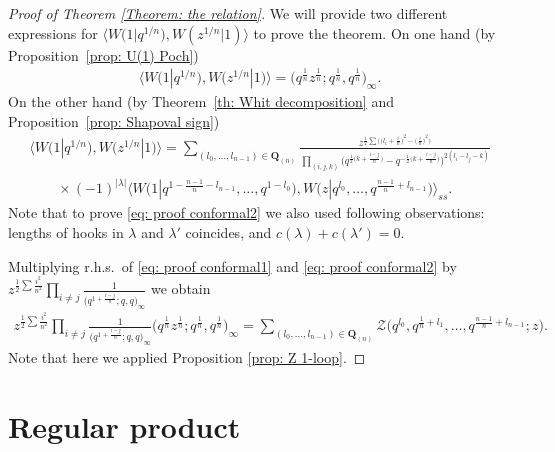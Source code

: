 \documentclass[pdftex]{sigma}
\numberwithin{equation}{section}
\theoremstyle{definition}
\newcommand{\Q}{\mathbf{Q}_{(n)}}
\begin{document}
\begin{proof}[Proof of Theorem \ref{Theorem: the relation}]
We will provide two different expressions for $\big\langle W\big(1| q^{1/n} \big) ,\! W(z^{1/n}|1) \big\rangle$ to prove the theorem. On one hand (by Proposition~\ref{prop: U(1) Poch})
\begin{gather}
\big\langle W\big(1| q^{1/n} \big) , W\big(z^{1/n}|1\big) \big\rangle = \big( q^{\frac{1}{n}} z^{\frac{1}{n}}; q^{\frac{1}{n}} ,q^{\frac{1}{n}} \big)_{\infty}. \label{eq: proof conformal1}
\end{gather}
On the other hand (by Theorem~\ref{th: Whit decomposition} and Proposition~\ref{prop: Shapoval sign})
\begin{gather}
\big\langle W\big(1| q^{1/n} \big) , W\big(z^{1/n}|1\big) \big\rangle = \sum_{(l_0, \dots, l_{n-1}) \in \Q} \frac{ z^{\frac12 \sum \big( \big(l_i + \frac{i}{n}\big)^2 - \big(\frac{i}{n}\big)^2 \big) } }{ \prod\limits_{(i,j,k)} \big(q^{\frac12 \big(k+ \frac{i-j}{n} \big)}-q^{-\frac12 \big( k+\frac{i-j}{n}\big)}\big)^{2(l_i-l_j-k)}} \nonumber\\ \qquad{} \times(-1)^{|\lambda|} \big\langle W\big(1 | q^{1-\frac{n-1}{n}- l_{n-1}} , \dots , q^{1-l_0}\big), W\big(z | q^{ l_0}, \dots , q^{\frac{n-1}{n}+ l_{n-1}}\big) \big\rangle_{ss}.
\label{eq: proof conformal2}
\end{gather}
Note that to prove \eqref{eq: proof conformal2} we also used following observations: lengths of hooks in $\lambda$ and $\lambda'$ coincides, and $c(\lambda)+ c(\lambda')=0$.

Multiplying r.h.s.\ of \eqref{eq: proof conformal1} and \eqref{eq: proof conformal2} by $z^{\frac12 \sum \frac{i^2}{n^2}} \prod\limits_{i \neq j} \frac{1}{\big(q^{1+\frac{i-j}{n}}; q, q \big)_{\infty}}$ we obtain
\begin{gather*}
z^{\frac12 \sum \frac{i^2}{n^2}}\! \prod_{i \neq j} \frac{1}{\big(q^{1+\frac{i-j}{n}}; q, q\big)_{\infty}} \big( q^{\frac{1}{n}} z^{\frac{1}{n}}; q^{\frac{1}{n}} ,q^{\frac{1}{n}} \big)_{\infty} = \sum_{(l_0, \dots, l_{n-1}) \in \Q}\!\!\! \mathcal{Z} \big(q^{l_0}, q^{\frac{1}{n}+l_1}, \dots, q^{\frac{n-1}{n} + l_{n-1}}; z \big).
\end{gather*}
Note that here we applied Proposition \ref{prop: Z 1-loop}.
\end{proof}

\appendix
\section{Regular product} \label{nonorm}
\end{document}
